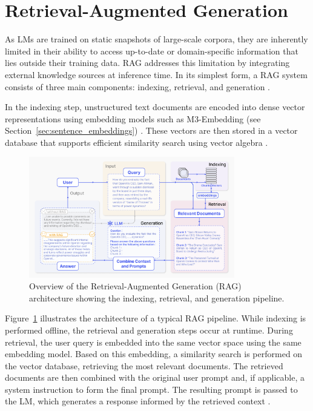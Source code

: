 \documentclass[a4paper,oneside,bibliography=totoc]{scrbook}
\begin{document}
\section{Retrieval-Augmented Generation}
\label{sec:retrieval_augmented_generation}

As \acp{LM} are trained on static snapshots of large-scale corpora, they are inherently limited in their ability to access up-to-date or domain-specific information that lies outside their training data. \Ac{RAG} addresses this limitation by integrating external knowledge sources at inference time. In its simplest form, a \ac{RAG} system consists of three main components: indexing, retrieval, and generation \cite{Gao2024}.

In the indexing step, unstructured text documents are encoded into dense vector representations using embedding models such as M3-Embedding (see Section~\ref{sec:sentence_embeddings}) \cite{Gao2024}. These vectors are then stored in a vector database that supports efficient similarity search using vector algebra \cite{Gao2024,Pan2024}.

\begin{figure}[t]
  \centering
  \includegraphics[width=0.8\textwidth]{figures/RAG.png}
  \caption[Overview of the Retrieval-Augmented Generation (RAG) architecture showing the indexing, retrieval, and generation pipeline]{Overview of the Retrieval-Augmented Generation (RAG) architecture showing the indexing, retrieval, and generation pipeline. \cite{Gao2024}}
  \label{fig:rag}
\end{figure}

Figure~\ref{fig:rag} illustrates the architecture of a typical RAG pipeline. While indexing is performed offline, the retrieval and generation steps occur at runtime. During retrieval, the user query is embedded into the same vector space using the same embedding model. Based on this embedding, a similarity search is performed on the vector database, retrieving the most relevant documents. The retrieved documents are then combined with the original user prompt and, if applicable, a system instruction to form the final prompt. The resulting prompt is passed to the \ac{LM}, which generates a response informed by the retrieved context \cite{Gao2024}.
\end{document}
